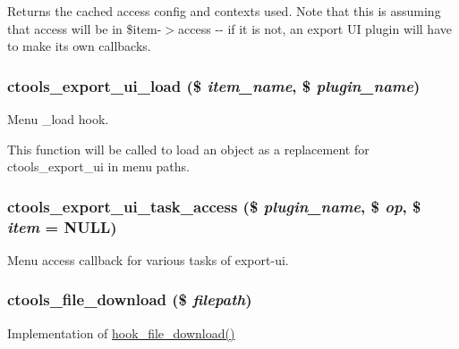Returns the cached access config and contexts used. Note that this is assuming that access will be in \$item-\/$>$access -\/-\/ if it is not, an export UI plugin will have to make its own callbacks. \hypertarget{ctools_8module_a9aa80761de735e1b6d9d1fbac0da04ad}{
\subsubsection[{ctools\_\-export\_\-ui\_\-load}]{\setlength{\rightskip}{0pt plus 5cm}ctools\_\-export\_\-ui\_\-load (\$ {\em item\_\-name}, \/  \$ {\em plugin\_\-name})}}
\label{ctools_8module_a9aa80761de735e1b6d9d1fbac0da04ad}
Menu \_\-load hook.

This function will be called to load an object as a replacement for ctools\_\-export\_\-ui in menu paths. \hypertarget{ctools_8module_a5e2e7c8a0fb252f056d980a6d6cc1e53}{
\subsubsection[{ctools\_\-export\_\-ui\_\-task\_\-access}]{\setlength{\rightskip}{0pt plus 5cm}ctools\_\-export\_\-ui\_\-task\_\-access (\$ {\em plugin\_\-name}, \/  \$ {\em op}, \/  \$ {\em item} = {\ttfamily NULL})}}
\label{ctools_8module_a5e2e7c8a0fb252f056d980a6d6cc1e53}
Menu access callback for various tasks of export-\/ui. \hypertarget{ctools_8module_ae5e454efdea69c33f8faf0d461dce188}{
\subsubsection[{ctools\_\-file\_\-download}]{\setlength{\rightskip}{0pt plus 5cm}ctools\_\-file\_\-download (\$ {\em filepath})}}
\label{ctools_8module_ae5e454efdea69c33f8faf0d461dce188}
Implementation of \hyperlink{group__hooks_gab73f0e658d6630220ba7836ccd011ecc}{hook\_\-file\_\-download()}


